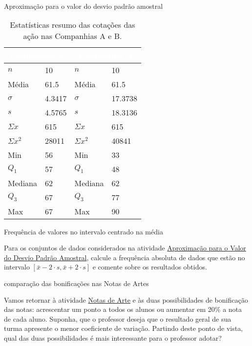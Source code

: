 {{{\begin{task}{Aproximação para o valor do desvio padrão amostral}
\begin{table}[H]
\centering
\begin{tabular}{|l|l|l|l|}
\hline
\multicolumn{2}{|c|}{\cellcolor{\currentcolor!80}\textcolor{white}{\textbf{Companhia A}}} & \multicolumn{2}{c|}{\cellcolor{\currentcolor!80}\textcolor{white}{\textbf{Companhia A}}} \\
\hline
$n$ & 10 & $n$ & 10 \\
\hline
Média & 61.5 & Média & 61.5 \\
\hline
$\sigma$ & 4.3417 & $\sigma$ & 17.3738 \\
\hline
$s$ & 4.5765 & $s$ & 18.3136 \\
\hline
$\Sigma x$ & 615 & $\Sigma x$ & 615 \\
\hline
$\Sigma x^2$ & 28011 & $\Sigma x^2$ & 40841 \\
\hline
Min & 56 & Min & 33 \\
\hline
$Q_1$ & 57 & $Q_1$ & 48 \\
\hline
Mediana & 62 & Mediana & 62 \\
\hline
$Q_3$ & 67 & $Q_3$ & 77 \\
\hline
Max & 67 & Max & 90 \\
\hline
\end{tabular}
\caption{Estatísticas resumo das cotações das ação nas Companhias A e B.}\label{\detokenize{PE104-5:fig-estrategia}}\label{\detokenize{PE104-5:id4}}
\end{table}
\end{task}

\label{\detokenize{PE104-5:ativ-mediamaisoumenosdoisdesvios}}
\begin{task}{Frequência de valores no intervalo centrado na média}

Para os conjuntos de dados considerados na atividade \hyperref[\detokenize{PE104-5:ativ-aproxima-dpa-usando-r}]{Aproximação para o Valor do Desvio Padrão Amostral}, calcule a frequência absoluta de dados que estão no intervalo \([\bar{x}-2\cdot s,\bar{x}+2\cdot s]\) e comente sobre os resultados obtidos.
\end{task}


\begin{task}{comparação das bonificações nas Notas de Artes}

Vamos retornar à atividade \hyperref[\detokenize{PE104-0:ativ-notas-de-artes}]{Notas de Arte} e às duas possibilidades de bonificação das notas: acrescentar um ponto a todos os alunos ou aumentar em 20\% a nota de cada aluno. Suponha, que o professor deseja que o resultado geral de sua turma apresente o menor coeficiente de variação. Partindo deste ponto de vista, qual das duas possibilidades é mais interessante para o professor adotar?


\end{task}}}}
